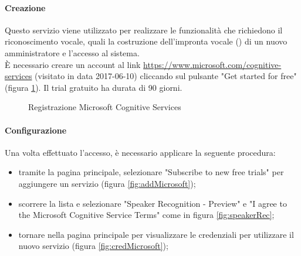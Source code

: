 \paragraph{Creazione}
Questo servizio viene utilizzato per realizzare le funzionalità che richiedono il riconoscimento vocale, quali la costruzione dell'impronta vocale () di un nuovo amministratore e l'accesso al sistema.\\
È necessario creare un account al link \url{https://www.microsoft.com/cognitive-services} (visitato in data 2017-06-10) cliccando sul pulsante "Get started for free" (figura \ref{fig:microsoft}). Il trial gratuito ha durata di 90 giorni.
\begin{figure}[h]
	\caption{Registrazione Microsoft Cognitive Services}\label{fig:microsoft}
\end{figure}
\paragraph{Configurazione}
Una volta effettuato l'accesso, è necessario applicare la seguente procedura:
\begin{itemize}
	\item tramite la pagina principale, selezionare "Subscribe to new free trials" per aggiungere un servizio (figura \ref{fig:addMicrosoft});
	\item scorrere la lista e selezionare "Speaker Recognition - Preview" e "I agree to the Microsoft Cognitive Service Terms" come in figura \ref{fig:speakerRec};
	\item tornare nella pagina principale per visualizzare le credenziali per utilizzare il nuovo servizio (figura \ref{fig:credMicrosoft});
\end{itemize}

